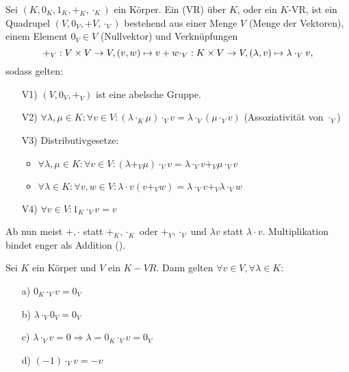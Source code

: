 
\begin{defi}
	Sei $(K,0_{K},1_{K},+_{K},\cdot_{K})$ ein Körper. Ein  (VR) über $K$, oder ein $K$-VR, ist ein Quadrupel $(V,0_{V},+{V},\cdot_{V})$ bestehend aus einer Menge $V$ (Menge der Vektoren), einem Element $0_{V}\in V$ (Nullvektor) und Verknüpfungen
	\[+_{V}:V\times V\rightarrow V,(v,w)\mapsto v+w \\
	\cdot_{V}:K\times V\rightarrow V,(\lambda,v)\mapsto\lambda\cdot_{V} v,\]
	sodass gelten:
	\begin{itemize}
		\item[V1)] $(V,0_{V},+_{V})$ ist eine abelsche Gruppe.
		\item[V2)] $\forall\lambda,\mu\in K:\forall v\in V:(\lambda\cdot_{K}\mu)\cdot_{V} v=\lambda\cdot_{V}(\mu\cdot_{V} v)$ \hfill (Assoziativität von $\cdot_{V}$)
		\item[V3)] Distributivgesetze:
		\begin{itemize}
			\item $\forall\lambda,\mu\in K:\forall v\in V:(\lambda+_{V}\mu)\cdot_{V} v=\lambda\cdot_{V} v+_{V}\mu\cdot_{V} v$
			\item $\forall\lambda\in K:\forall v,w\in V:\lambda\cdot v(v+_{V} w)=\lambda\cdot_{V} v+_{V}\lambda\cdot_{V} w$
		\end{itemize}
		\item[V4)] $\forall v\in V:1_{K}\cdot_{V} v=v$
	\end{itemize}
\end{defi}

\begin{nota}
	Ab nun meist $+,\cdot$ statt $+_{K},\cdot_{K}$ oder $+_{V},\cdot_{V}$ und $\lambda v$ statt $\lambda\cdot v$. Multiplikation bindet enger als Addition ().
\end{nota}

\begin{lem}
	Sei $K$ ein Körper und $V$ ein $K-VR$. Dann gelten $\forall v\in V,\forall\lambda\in K:$
	\begin{itemize}
		\item[a)] $0_{K}\cdot_{V} v=0_{V}$
		\item[b)] $\lambda\cdot_{V} 0_{V}=0_{V}$
		\item[c)] $\lambda\cdot_{V} v=0\Rightarrow \lambda=0_{K}\cdot_{V} v=0_{V}$
		\item[d)] $(-1)\cdot_{V} v =-v$
	\end{itemize}
\end{lem}

